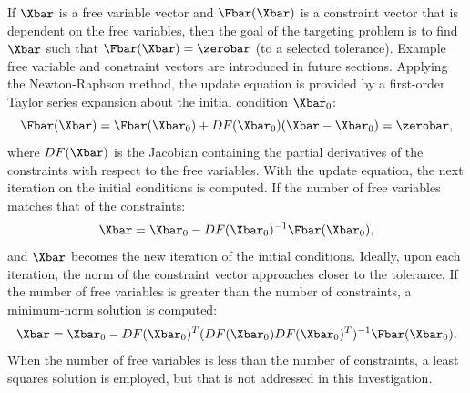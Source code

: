 If $\Xbar$ is a free variable vector and $\Fbar(\Xbar)$ is a constraint vector that is dependent on
the free variables, then the goal of the targeting problem is to find $\Xbar$ such that
$\Fbar(\Xbar)=\zerobar$ (to a selected tolerance). Example free variable and constraint vectors
are introduced in future sections. Applying the Newton-Raphson method, the update equation is
provided by a first-order Taylor series expansion about the initial condition $\Xbar_{0}$:
\begin{equation}
    \Fbar(\Xbar)=\Fbar(\Xbar_{0})+DF(\Xbar_{0})(\Xbar-\Xbar_{0})=\zerobar,
    \label{eq:updateequation}
\end{equation}
where $DF(\Xbar)$ is the Jacobian containing the partial derivatives of the constraints with
respect to the free variables. With the update equation, the next iteration on the initial
conditions is computed. If the number of free variables matches that of the constraints:
\begin{equation}
    \Xbar=\Xbar_{0}-DF(\Xbar_{0})^{-1}\Fbar(\Xbar_{0}),
    \label{eq:NRsolution}
\end{equation}
and $\Xbar$ becomes the new iteration of the initial conditions. Ideally, upon each iteration, the
norm of the constraint vector approaches closer to the tolerance. If the number of free variables
is greater than the number of constraints, a minimum-norm solution is computed:
\begin{equation}
    \Xbar=\Xbar_{0}-DF(\Xbar_{0})^{T}(DF(\Xbar_{0})DF(\Xbar_{0})^{T})^{-1}\Fbar(\Xbar_{0}).
    \label{eq:minimumnorm}
\end{equation}
When the number of free variables is less than the number of constraints, a least squares solution
is employed, but that is not addressed in this investigation.

